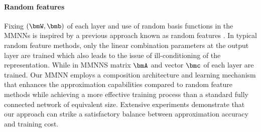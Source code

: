 \documentclass[review,hidelinks,onefignum,onetabnum]{siamart250211}
\begin{document}
\paragraph{Random features} 
Fixing $(\bmW, \bmb)$ of each layer and use of random basis functions in the MMNNs is inspired by a previous approach known as random features \cite{NIPS2007_013a006f,NIPS2016_e7061188,9495136,NIPS2017_61b1fb3f,peng2021random}. In typical random feature methods, only the linear combination parameters at the output layer are trained which also leads to the issue of ill-conditioning of the representation. While in MMNNS matrix $\bmA$ and vector $\bmc$ of each layer are trained. 
Our MMNN employs a composition architecture and learning mechanism that enhances the approximation capabilities compared to random feature methods while achieving a more effective training process than a standard fully connected network of equivalent size. Extensive experiments demonstrate that our approach can strike a satisfactory balance between approximation accuracy and training cost.
\end{document}
